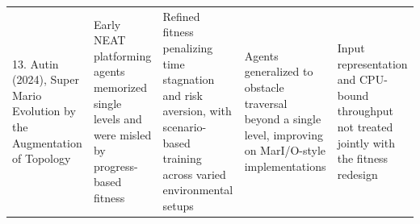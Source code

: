\begin{longtable}{@{}R{0.175\textwidth} R{0.185\textwidth} R{0.185\textwidth} R{0.185\textwidth} R{0.185\textwidth}@{}}
13. Autin~\cite{autin2024} (2024), Super Mario Evolution by the Augmentation of Topology &
Early NEAT platforming agents memorized single levels and were misled by
progress-based fitness &
Refined fitness penalizing time stagnation and risk aversion, with
scenario-based training across varied environmental setups &
Agents generalized to obstacle traversal beyond a single level, improving on
MarI/O-style implementations &
Input representation and CPU-bound throughput not treated jointly with the
fitness redesign \\
\end{longtable}
\endgroup
